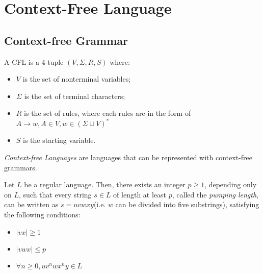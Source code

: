 \documentclass{report}
\begin{document}
	\section{Context-Free Language}
		\subsection{Context-free Grammar}
			\begin{defn} \label{def_cfl}
				A CFL is a 4-tuple $(V,\Sigma,R,S)$ where:
				\begin{itemize}
					\item $V$ is the set of nonterminal variables;
					\item $\Sigma$ is the set of terminal characters;
					\item $R$ is the set of rules, where each rules are in the form of $A\rightarrow w, A\in V, w\in (\Sigma \cup V)^*$
					\item $S$ is the starting variable.
				\end{itemize}
			\end{defn}
			
			\begin{defn} \label{def_CFL}
				\emph{Context-free Languages} are languages that can be represented with context-free grammars.
			\end{defn}
			
			\begin{thm} \label{thm_pumping_lemma_CFL}
				Let $L$ be a regular language. Then, there exists an integer $p \ge 1$, depending only on $L$, such that every string $s \in L$ of length at least $p$, called the \emph{pumping length}, can be written as $s=uvwxy$(i.e. $w$ can be divided into five substrings), satisfying the following conditions:
				\begin{itemize}
					\item $|vx| \ge 1$
					\item $|vwx| \le p$
					\item $\forall n \ge 0, uv^nwx^ny \in L$
				\end{itemize}
			\end{thm}
\end{document}
